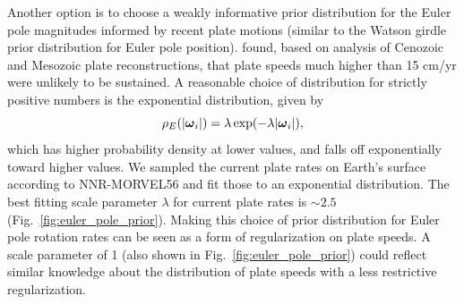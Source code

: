 \documentclass[11pt,letterpaper]{article}
\newcommand{\mitbf}[1]{\hbox{\mathversion{bold}$#1$}}
\begin{document}
Another option is to choose a weakly informative prior distribution for the Euler pole magnitudes informed by recent plate motions (similar to the Watson girdle prior distribution for Euler pole position). \cite{Zahirovic2015a} found, based on analysis of Cenozoic and Mesozoic plate reconstructions, that plate speeds much higher than 15 cm/yr were unlikely to be sustained. A reasonable choice of distribution for strictly positive numbers is the exponential distribution, given by
\begin{equation}
\rho_E(\vert \mitbf{\omega}_i \vert) = \lambda \exp(-\lambda \vert \mitbf{\omega}_i \vert),
\end{equation}
which has higher probability density at lower values, and falls off exponentially toward higher values. We sampled the current plate rates on Earth's surface according to NNR-MORVEL56 and fit those to an exponential distribution. The best fitting scale parameter $\lambda$ for current plate rates is $\sim2.5$ (Fig.~\ref{fig:euler_pole_prior}). Making this choice of prior distribution for Euler pole rotation rates can be seen as a form of regularization on plate speeds. A scale parameter of 1 (also shown in Fig.~\ref{fig:euler_pole_prior}) could reflect similar knowledge about the distribution of plate speeds with a less restrictive regularization.
\end{document}
